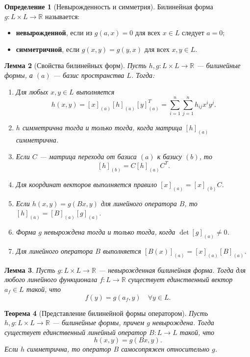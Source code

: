 \documentclass[12pt,a4paper]{article}
\newtheorem{theorem}{Теорема}[section]
\newtheorem{lemma}[theorem]{Лемма}
\theoremstyle{definition}
\newtheorem{definition}[theorem]{Определение}
\begin{document}
\begin{definition}[Невырожденность и симметрия]
Билинейная форма $g: L \times L \to \mathbb{R}$ называется:
\begin{itemize}
    \item \textbf{невырожденной}, если из $g(a, x) = 0$ для всех $x \in L$ следует $a = 0$;
    \item \textbf{симметричной}, если $g(x, y) = g(y, x)$ для всех $x, y \in L$.
\end{itemize}
\end{definition}

\begin{lemma}[Свойства билинейных форм]
Пусть $h, g: L \times L \to \mathbb{R}$ --- билинейные формы, а $(a)$ --- базис пространства $L$. Тогда:
\begin{enumerate}
    \item Для любых $x,y \in L$ выполняется
    $$h(x,y) = [x]_{(a)} [h]_{(a)} [y]_{(a)}^T = \sum_{i=1}^n \sum_{j=1}^n h_{ij} x^i y^j.$$
    \item $h$ симметрична тогда и только тогда, когда матрица $[h]_{(a)}$ симметрична.
    \item Если $C$ --- матрица перехода от базиса $(a)$ к базису $(b)$, то
    $$[h]_{(b)} = C [h]_{(a)} C^T.$$
    \item Для координат векторов выполняется правило $[x]_{(a)} = [x]_{(b)} C$.
    \item Если $h(x,y) = g(Bx, y)$ для линейного оператора $B$, то $[h]_{(a)} = [B]_{(a)} [g]_{(a)}$.
    \item Форма $g$ невырождена тогда и только тогда, когда $\det[g]_{(a)} \neq 0$.
    \item Для линейного оператора $B$ выполняется $[B(x)]_{(a)} = [x]_{(a)} [B]_{(a)}$.
\end{enumerate}
\end{lemma}

\begin{lemma}
Пусть $g: L \times L \to \mathbb{R}$ --- невырожденная билинейная форма. Тогда для любого линейного функционала $f: L \to \mathbb{R}$ существует единственный вектор $a_f \in L$ такой, что
$$f(y) = g(a_f, y) \quad \forall y \in L.$$
\end{lemma}

\begin{theorem}[Представление билинейной формы оператором]
Пусть $h, g: L \times L \to \mathbb{R}$ --- билинейные формы, причем $g$ невырождена. Тогда существует единственный линейный оператор $B: L \to L$ такой, что
$$h(x, y) = g(Bx, y).$$
Если $h$ симметрична, то оператор $B$ самосопряжен относительно $g$.
\end{theorem}
\end{document}
